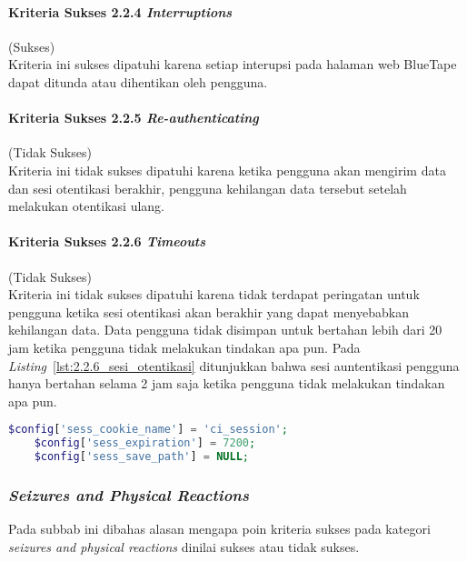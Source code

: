 \paragraph{Kriteria Sukses 2.2.4 \textit{Interruptions}}
\label{par:kepatuhan_bluetape_kriteria_sukses_2.2.4}
(Sukses)\\

Kriteria ini sukses dipatuhi karena setiap interupsi pada halaman web BlueTape dapat ditunda atau dihentikan oleh pengguna.

\paragraph{Kriteria Sukses 2.2.5 \textit{Re-authenticating}}
\label{par:kepatuhan_bluetape_kriteria_sukses_2.2.5}
(Tidak Sukses)\\

Kriteria ini tidak sukses dipatuhi karena ketika pengguna akan mengirim data dan sesi otentikasi berakhir, pengguna kehilangan data tersebut setelah melakukan otentikasi ulang.

\paragraph{Kriteria Sukses 2.2.6 \textit{Timeouts}}
\label{par:kepatuhan_bluetape_kriteria_sukses_2.2.6}
(Tidak Sukses)\\

Kriteria ini tidak sukses dipatuhi karena tidak terdapat peringatan untuk pengguna ketika sesi otentikasi akan berakhir yang dapat menyebabkan kehilangan data. Data pengguna tidak disimpan untuk bertahan lebih dari 20 jam ketika pengguna tidak melakukan tindakan apa pun. Pada \mbox{\textit{Listing} \ref{lst:2.2.6_sesi_otentikasi}} ditunjukkan bahwa sesi auntentikasi pengguna hanya bertahan selama 2 jam saja ketika pengguna tidak melakukan tindakan apa pun.

\begin{lstlisting}[frame=single, label={lst:2.2.6_sesi_otentikasi}, language=PHP, caption=Pelanggaran Kriteria Sukses 2.2.6 pada Bagian Sesi Otentikasi]
    $config['sess_cookie_name'] = 'ci_session';
    $config['sess_expiration'] = 7200;
    $config['sess_save_path'] = NULL;
\end{lstlisting}

\subsubsection{\textit{Seizures and Physical Reactions}}
\label{subsubsec:kepatuhan_bluetape_seizures_and_physical_reactions}
Pada subbab ini dibahas alasan mengapa poin kriteria sukses pada kategori \textit{seizures and physical reactions} dinilai sukses atau tidak sukses.

